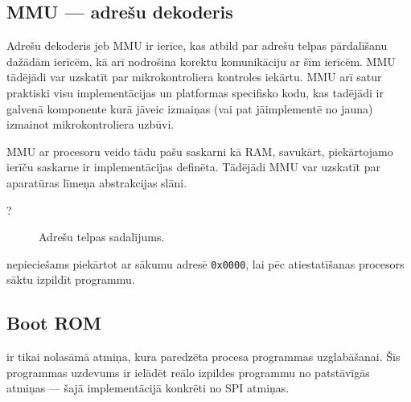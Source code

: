 

\subsection{MMU — adrešu dekoderis} \label{sec:mmu}
	Adrešu dekoderis jeb MMU ir ierīce, kas atbild par adrešu telpas
	pārdalīšanu dažādām ierīcēm, kā arī nodrošina korektu komunikāciju
	ar šīm ierīcēm. MMU tādējādi var uzskatīt par mikrokontroliera kontroles
	iekārtu. MMU arī satur praktiski visu implementācijas un platformas
	specifisko kodu, kas tadējādi ir galvenā komponente kurā jāveic izmaiņas
	(vai pat jāimplementē no jauna) izmainot mikrokontroliera uzbūvi.
	
	MMU ar procesoru veido tādu pašu saskarni kā RAM,
	savukārt, piekārtojamo ierīču saskarne ir implementācijas definēta.
	Tādējādi MMU var uzskatīt par aparatūras līmeņa abstrakcijas slāni.
	
	\todo ?
	
	\begin{figure}[thp]
		\centering
		\def\svgwidth{0.9\textwidth}
		{\ttfamily\small}
		\caption{Adrešu telpas sadalījums.}
		\label{fig:memory-map}
	\end{figure}
	
	 nepieciešams piekārtot ar sākumu adresē \texttt{0x0000},
	lai pēc atiestatīšanas procesors sāktu izpildīt  programmu.


\subsection{Boot ROM}
	 ir tikai nolasāmā atmiņa, kura paredzēta
	 procesa programmas uzglabāšanai.
	Šīs programmas uzdevums ir ielādēt reālo izpildes programmu no
	patstāvīgās atmiņas — šajā implementācijā konkrēti 
	no SPI  atmiņas.
	
